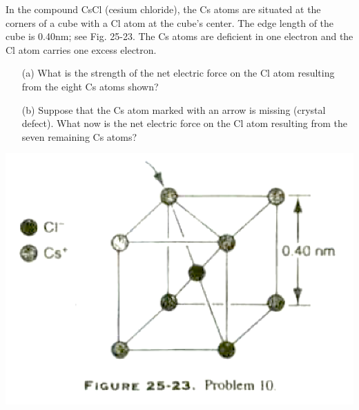 \documentclass[11pt,letterpaper,boxed]{hmcpset}
\begin{document}
	\begin{problem}[HRK P25.10]
		In the compound CsCl (cesium chloride), the Cs atoms are situated at the corners of a cube with a Cl atom at the cube's center. The edge length of the cube is 0.40nm; see Fig. 25-23. The Cs atoms are deficient in one electron and the Cl atom carries one excess electron. 
		
		\begin{enumerate}
			\item[(a)] What is the strength of the net electric force on the Cl atom resulting from the eight Cs atoms shown? 
			\item[(b)] Suppose that the Cs atom marked with an arrow is missing (crystal defect). What now is the net electric force on the Cl atom resulting from the seven remaining Cs atoms?
		\end{enumerate}
	
		\begin{center}
			\includegraphics[scale=0.5]{25-23.png}
		\end{center}

	\end{problem}
	
	\begin{solution}
		\vfill
	\end{solution}
	\newpage
	
\end{document}
